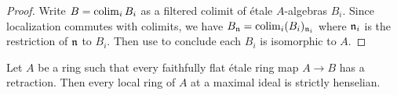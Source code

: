 \begin{proof}
  Write $B = \operatorname{colim}_i B_i$ as a filtered colimit of étale $A$-algebras $B_i$. Since localization commutes with colimits, we have $B_{\mathfrak{n}} = \operatorname{colim}_i (B_i)_{{\mathfrak{n}}_i}$ where ${\mathfrak{n}}_i$ is the restriction of ${\mathfrak{n}}$ to $B_i$. Then use  to conclude each $B_i$ is isomorphic to $A$.
\end{proof}

\begin{lemma}
    Let $A$ be a ring such that every faithfully flat étale ring map $A \to B$ has
    a retraction. Then every local ring of $A$ at a maximal ideal is strictly henselian.
    \label{lemma:retractions-strictly-henselian}
\end{lemma}

